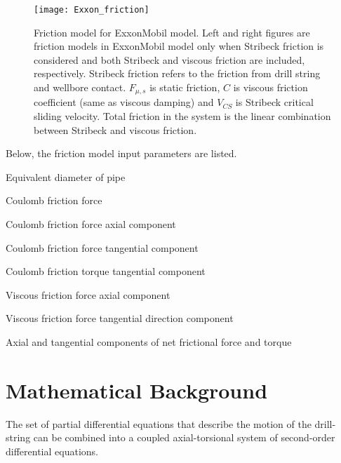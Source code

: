 \begin{figure}
  \centering
  \texttt{[image: Exxon\_friction]}
  \caption[Friction model for ExxonMobil model]{Friction model for ExxonMobil model. Left and right figures are friction models in ExxonMobil model only when Stribeck friction is considered and both Stribeck and viscous friction are included, respectively. Stribeck friction refers to the friction from drill string and wellbore contact. $F_{\mu, s}$ is static friction, $C$ is viscous friction coefficient (same as viscous damping) and $V_{CS}$ is Stribeck critical sliding velocity. Total friction in the system is the linear combination between Stribeck and viscous friction. }\label{figure_Exxon_friction}
\end{figure}


Below, the friction model input parameters are listed. 
\begin{bulletedlist}
    \item Equivalent diameter of pipe
    \item Coulomb friction force
    \item Coulomb friction force axial component
    \item Coulomb friction force tangential component
    \item Coulomb friction torque tangential component
    \item Viscous friction force axial component
    \item Viscous friction force tangential direction component
    \item Axial and tangential components of net frictional force and torque
\end{bulletedlist}

\section{Mathematical Background}

The set of partial differential equations that describe the motion of the drill-string can be combined into a coupled axial-torsional system of second-order differential equations.


